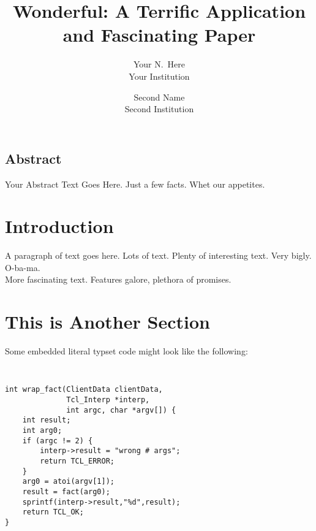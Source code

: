 \documentclass[letterpaper,twocolumn,10pt]{article}
\begin{document}
\date{}

\title{\Large \bf Wonderful: A Terrific Application and Fascinating Paper}

\author{
{\rm Your N.\ Here}\\
Your Institution
\and
{\rm Second Name}\\
Second Institution
} %

\maketitle

\thispagestyle{empty}


\subsection*{Abstract}
Your Abstract Text Goes Here. Just a few facts.
Whet our appetites.

\section{Introduction}

A paragraph of text goes here. Lots of text. Plenty of interesting text. Very bigly. O-ba-ma.\\

More fascinating text. Features galore, plethora of promises.\\

\section{This is Another Section}

Some embedded literal typset code might look like the following:

{\tt \small
\begin{verbatim}
int wrap_fact(ClientData clientData,
              Tcl_Interp *interp,
              int argc, char *argv[]) {
    int result;
    int arg0;
    if (argc != 2) {
        interp->result = "wrong # args";
        return TCL_ERROR;
    }
    arg0 = atoi(argv[1]);
    result = fact(arg0);
    sprintf(interp->result,"%d",result);
    return TCL_OK;
}
\end{verbatim}
}
\end{document}
